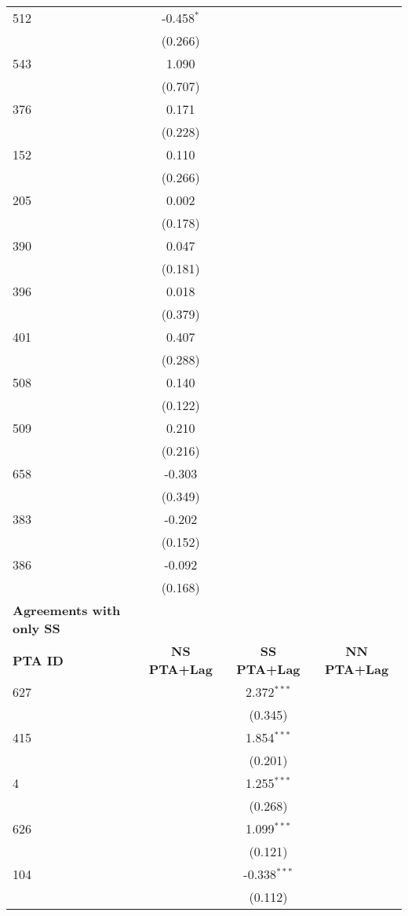 \begin{center}
\begin{longtable}{lccc}
    512 & -0.458$^{\ast}$ &  &  \\
    & (0.266) &  &  \\
    543 & 1.090 &  &  \\
    & (0.707) &  &  \\
    376 & 0.171 &  &  \\
    & (0.228) &  &  \\
    152 & 0.110 &  &  \\
    & (0.266) &  &  \\
    205 & 0.002 &  &  \\
    & (0.178) &  &  \\
    390 & 0.047 &  &  \\
    & (0.181) &  &  \\
    396 & 0.018 &  &  \\
    & (0.379) &  &  \\
    401 & 0.407 &  &  \\
    & (0.288) &  &  \\
    508 & 0.140 &  &  \\
    & (0.122) &  &  \\
    509 & 0.210 &  &  \\
    & (0.216) &  &  \\
    658 & -0.303 &  &  \\
    & (0.349) &  &  \\
    383 & -0.202 &  &  \\
    & (0.152) &  &  \\
    386 & -0.092 &  &  \\
    & (0.168) &  &  \\
    \hline
    \textbf{Agreements with only SS} &  &  &  \\
    \hline
    \textbf{PTA ID} & \textbf{NS PTA+Lag} & \textbf{SS PTA+Lag} & \textbf{NN PTA+Lag} \\
    \hline
    627 &  & 2.372$^{\ast\ast\ast}$ &  \\
    &  & (0.345) &  \\
    415   &  & 1.854$^{\ast\ast\ast}$ &  \\
    &  & (0.201) &  \\
    4   &  & 1.255$^{\ast\ast\ast}$ &  \\
    &  & (0.268) &  \\
    626 &  & 1.099$^{\ast\ast\ast}$ &  \\
    &  & (0.121) &  \\
    104 &  & -0.338$^{\ast\ast\ast}$ &  \\
    &  & (0.112) &  \\

\end{longtable}
\end{center}
